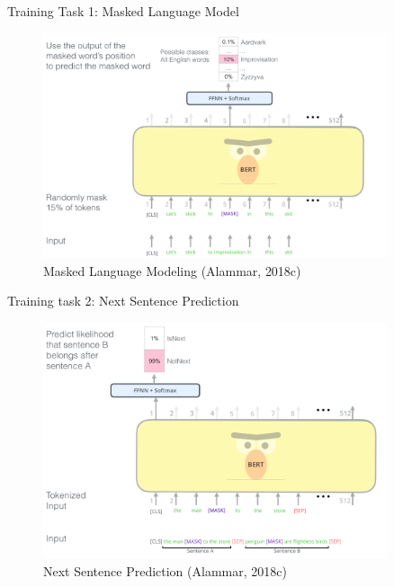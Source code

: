\documentclass[10pt]{beamer}
\begin{document}
\begin{frame}{Training Task 1: Masked Language Model}

\begin{figure}[h]
\centering
\includegraphics[width=0.9\textwidth]{fig/BERT-language-modeling-masked-lm.png}
\caption{Masked Language Modeling (Alammar, 2018c)}
\end{figure}

\end{frame}


\begin{frame}{Training task 2: Next Sentence Prediction}

\begin{figure}[h]
\centering
\includegraphics[width=0.9\textwidth]{fig/bert-next-sentence-prediction.png}
\caption{Next Sentence Prediction (Alammar, 2018c)}
\end{figure}

\end{frame}
\end{document}
